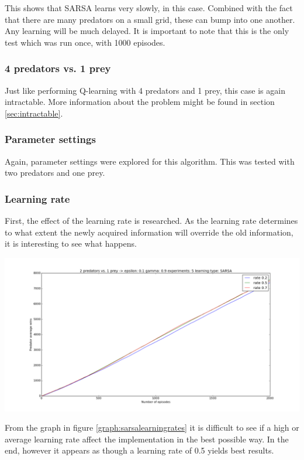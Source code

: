 This shows that SARSA learns very slowly, in this case. Combined with the fact that there are many predators on a small grid, these can bump into one another. Any learning will be much delayed. It is important to note that this is the only test which was run once, with 1000 episodes.

\subsubsection{4 predators vs. 1 prey}
Just like performing Q-learning with 4 predators and 1 prey, this case is again intractable. More information about the problem might be found in section \ref{sec:intractable}.

\subsubsection{Parameter settings}
Again, parameter settings were explored for this algorithm. This was tested with two predators and one prey.

\subsubsection{Learning rate}
First, the effect of the learning rate is researched. As the learning rate determines to what extent the newly acquired information will override the old information, it is interesting to see what happens. 

\begin{center}
	\includegraphics[scale=0.3]{2_predators_learning_rate_SARSA}
	\label{graph:sarsalearningrates}
\end{center}

From the graph in figure \ref{graph:sarsalearningrates} it is difficult to see if a high or average learning rate affect the implementation in the best possible way. In the end, however it appears as though a learning rate of 0.5 yields best results.

